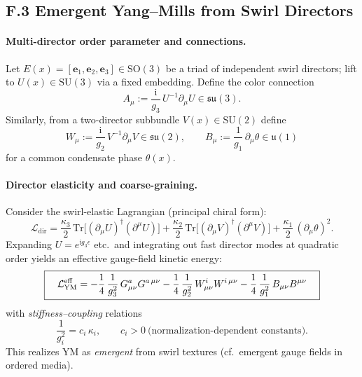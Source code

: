 \documentclass[11pt]{article}
\newcommand{\Tr}{\mathrm{Tr}}
\newcommand{\ii}{\mathrm{i}}
\begin{document}
\subsection*{F.3 Emergent Yang--Mills from Swirl Directors}

\paragraph{Multi-director order parameter and connections.}
Let $E(x)=[\mathbf e_1,\mathbf e_2,\mathbf e_3]\in\mathrm{SO}(3)$ be a triad of independent swirl directors; lift to $U(x)\in\mathrm{SU}(3)$ via a fixed embedding. Define the color connection
\[
	A_\mu := \frac{\ii}{g_3}\,U^{-1}\partial_\mu U \in \mathfrak{su}(3).
\]
Similarly, from a two-director subbundle $V(x)\in \mathrm{SU}(2)$ define
\[
	W_\mu := \frac{\ii}{g_2}\,V^{-1}\partial_\mu V \in \mathfrak{su}(2),
	\qquad
	B_\mu := \frac{1}{g_1}\,\partial_\mu \theta \in \mathfrak u(1)
\]
for a common condensate phase $\theta(x)$.

\paragraph{Director elasticity and coarse-graining.}
Consider the swirl-elastic Lagrangian (principal chiral form)\cite{Fradkin2013,Volovik2003,Cho1980,FaddeevNiemi1999}:
\[
    \mathcal L_{\text{dir}}
    =\frac{\kappa_3}{2}\,\Tr\!\big[(\partial_\mu U)^\dagger (\partial^\mu U)\big]
    +\frac{\kappa_2}{2}\,\Tr\!\big[(\partial_\mu V)^\dagger (\partial^\mu V)\big]
    +\frac{\kappa_1}{2}\,(\partial_\mu\theta)^2.
\]
Expanding $U=e^{\ii g_3 \epsilon}$ etc.\ and integrating out fast director modes at quadratic order yields an effective gauge-field kinetic energy:
\[
    \boxed{\quad
    \mathcal L_{\rm YM}^{\rm eff}
    = -\frac{1}{4}\,\frac{1}{g_3^2}\,G^a_{\mu\nu}G^{a\,\mu\nu}
    -\frac{1}{4}\,\frac{1}{g_2^2}\,W^i_{\mu\nu}W^{i\,\mu\nu}
    -\frac{1}{4}\,\frac{1}{g_1^2}\,B_{\mu\nu}B^{\mu\nu}\quad}
\]
with \emph{stiffness--coupling} relations
\[
    \frac{1}{g_i^2}=c_i\,\kappa_i,\qquad c_i>0\ \text{(normalization-dependent constants).}
\]
This realizes YM as \emph{emergent} from swirl textures (cf.\ emergent gauge fields in ordered media)\cite{Volovik2003,Fradkin2013,Zee2010,Wen2004}.
\end{document}
